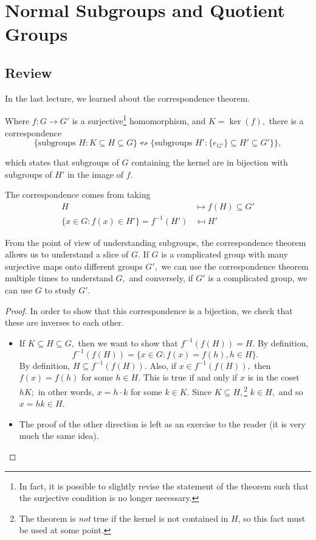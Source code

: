 
\section{Normal Subgroups and Quotient Groups}
\subsection{Review}
In the last lecture, we learned about the correspondence theorem. 

\begin{theorem}
Where $f: G \rightarrow G'$ is a surjective\footnote{In fact, it is possible to slightly revise the statement of the theorem such that the surjective condition is no longer necessary.} homomorphism, and $K = \ker(f),$ there is a correspondence 
\[
\{\text{subgroups } H: K \subseteq H \subseteq G\} \leftrightsquigarrow \{\text{subgroups } H' : \{e_{G'}\} \subseteq H' \subseteq G'\}\},
\]

which states that subgroups of $G$ containing the kernel are in bijection with subgroups of $H'$ in the image of $f.$
\end{theorem}

The correspondence comes from taking 
\begin{align*}
H &\mapsto f(H) \subseteq G' \\
\{x \in G : f(x) \in H'\} = f^{-1}(H') &\mapsfrom H'
\end{align*}

From the point of view of understanding subgroups, the correspondence theorem allows us to understand a slice of $G.$ If $G$ is a complicated group with many surjective maps onto different groups $G',$ we can use the correspondence theorem multiple times to understand $G,$ and conversely, if $G'$ is a complicated group, we can use $G$ to study $G'.$ 

\begin{proof}
In order to show that this correspondence is a bijection, we check that these are inverses to each other. 
\begin{itemize}
    \item If $K \subseteq H \subseteq G,$ then we want to show that $f^{-1}(f(H)) = H.$ By definition, 
    \[ 
    f^{-1}(f(H)) = \{x \in G : f(x) = f(h), h \in H\}.
    \]
    By definition, $H \subseteq f^{-1}(f(H)).$ Also, if $x \in f^{-1}(f(H)),$ then $f(x) = f(h)$ for some $h \in H.$ This is true if and only if $x$ is in the coset $hK;$ in other words, $x = h\cdot k$ for some $k \in K.$ Since $K \subseteq H,$\footnote{The theorem is \emph{not} true if the kernel is not contained in $H$, so this fact must be used at some point.} $k \in H,$ and so $x = hk \in H.$ 
    \item The proof of the other direction is left as an exercise to the reader (it is very much the same idea).  
\end{itemize}
\end{proof}


